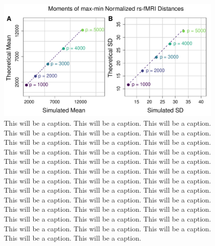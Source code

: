 \documentclass[10pt,letterpaper]{article}\usepackage[]{graphicx}\usepackage[]{color}
\begin{document}
\begin{figure}[H]
	\includegraphics[width=\textwidth]{compared_moments_rs-fMRI_max-min.pdf}
	\caption{This will be a caption. This will be a caption. This will be a caption. This will be a caption. This will be a caption. This will be a caption. This will be a caption. This will be a caption. This will be a caption. This will be a caption. This will be a caption. This will be a caption. This will be a caption. This will be a caption. This will be a caption. This will be a caption. This will be a caption. This will be a caption. This will be a caption. This will be a caption. This will be a caption. This will be a caption. This will be a caption. This will be a caption. This will be a caption. This will be a caption. This will be a caption. This will be a caption. This will be a caption. This will be a caption. This will be a caption. This will be a caption. This will be a caption. This will be a caption. This will be a caption. This will be a caption. This will be a caption. This will be a caption.}
\end{figure}

%
\end{document}
